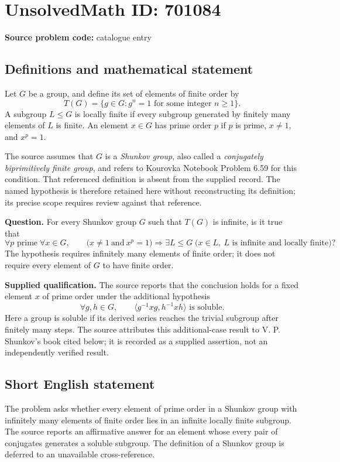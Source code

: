 \documentclass[11pt]{article}
\begin{document}
\section*{UnsolvedMath ID: 701084}
\textbf{Source problem code:} catalogue entry
\subsection{Definitions and mathematical statement}
Let \(G\) be a group, and define its set of elements of finite order by
\[
T(G)=\{g\in G: g^n=1\text{ for some integer }n\geq 1\}.
\]
A subgroup \(L\leq G\) is locally finite if every subgroup generated by finitely many elements of \(L\) is finite. An element \(x\in G\) has prime order \(p\) if \(p\) is prime, \(x\neq 1\), and \(x^p=1\).

The source assumes that \(G\) is a \emph{Shunkov group}, also called a \emph{conjugately biprimitively finite group}, and refers to Kourovka Notebook Problem 6.59 for this condition. That referenced definition is absent from the supplied record. The named hypothesis is therefore retained here without reconstructing its definition; its precise scope requires review against that reference.

\textbf{Question.} For every Shunkov group \(G\) such that \(T(G)\) is infinite, is it true that
\[
\forall p\text{ prime}\;\forall x\in G,\qquad
\bigl(x\neq 1\ \text{and}\ x^p=1\bigr)
\Longrightarrow
\exists L\leq G\;
\bigl(x\in L,\ L\text{ is infinite and locally finite}\bigr)?
\]
The hypothesis requires infinitely many elements of finite order; it does not require every element of \(G\) to have finite order.

\textbf{Supplied qualification.} The source reports that the conclusion holds for a fixed element \(x\) of prime order under the additional hypothesis
\[
\forall g,h\in G,\qquad
\langle g^{-1}xg,h^{-1}xh\rangle\text{ is soluble}.
\]
Here a group is soluble if its derived series reaches the trivial subgroup after finitely many steps. The source attributes this additional-case result to V. P. Shunkov's book cited below; it is recorded as a supplied assertion, not an independently verified result.
\subsection{Short English statement}
The problem asks whether every element of prime order in a Shunkov group with infinitely many elements of finite order lies in an infinite locally finite subgroup. The source reports an affirmative answer for an element whose every pair of conjugates generates a soluble subgroup. The definition of a Shunkov group is deferred to an unavailable cross-reference.
\end{document}
